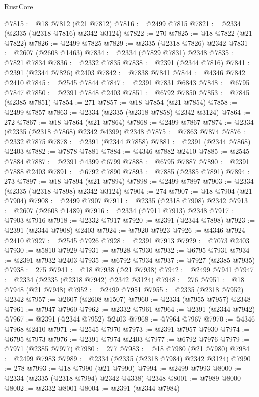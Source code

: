 \begin{lexlean}{RustCore}
\begin{coremodule}
@7815 := @18 @7812 (@21 @7812)
@7816 := @2499 @7815
@7821 := @2334 (@2335 (@2318 @7816) @2342 @3124)
@7822 := 270
@7825 := @18 @7822 (@21 @7822)
@7826 := @2499 @7825
@7829 := @2335 (@2318 @7826) @2342
@7831 := @2607 (@2608 @1463)
@7834 := @2334 (@7829 @7831) @2348
@7835 := @7821 @7834
@7836 := @2332 @7835
@7838 := @2391 (@2344 @7816)
@7841 := @2391 (@2344 @7826) @2403
@7842 := @7838 @7841
@7844 := @4346 @7842 @2410
@7845 := @2545 @7844
@7847 := @2391 @7831 @6843
@7848 := @6795 @7847
@7850 := @2391 @7848 @2403
@7851 := @6792 @7850
@7853 := @7845 (@2385 @7851)
@7854 := 271
@7857 := @18 @7854 (@21 @7854)
@7858 := @2499 @7857
@7863 := @2334 (@2335 (@2318 @7858) @2342 @3124)
@7864 := 272
@7867 := @18 @7864 (@21 @7864)
@7868 := @2499 @7867
@7874 := @2334 (@2335 (@2318 @7868) @2342 @4399) @2348
@7875 := @7863 @7874
@7876 := @2332 @7875
@7878 := @2391 (@2344 @7858)
@7881 := @2391 (@2344 @7868) @2403
@7882 := @7878 @7881
@7884 := @4346 @7882 @2410
@7885 := @2545 @7884
@7887 := @2391 @4399 @6799
@7888 := @6795 @7887
@7890 := @2391 @7888 @2403
@7891 := @6792 @7890
@7893 := @7885 (@2385 @7891)
@7894 := 273
@7897 := @18 @7894 (@21 @7894)
@7898 := @2499 @7897
@7903 := @2334 (@2335 (@2318 @7898) @2342 @3124)
@7904 := 274
@7907 := @18 @7904 (@21 @7904)
@7908 := @2499 @7907
@7911 := @2335 (@2318 @7908) @2342
@7913 := @2607 (@2608 @1489)
@7916 := @2334 (@7911 @7913) @2348
@7917 := @7903 @7916
@7918 := @2332 @7917
@7920 := @2391 (@2344 @7898)
@7923 := @2391 (@2344 @7908) @2403
@7924 := @7920 @7923
@7926 := @4346 @7924 @2410
@7927 := @2545 @7926
@7928 := @2391 @7913
@7929 := @7073 @2403
@7930 := @5810 @7929
@7931 := @7928 @7930
@7932 := @6795 @7931
@7934 := @2391 @7932 @2403
@7935 := @6792 @7934
@7937 := @7927 (@2385 @7935)
@7938 := 275
@7941 := @18 @7938 (@21 @7938)
@7942 := @2499 @7941
@7947 := @2334 (@2335 (@2318 @7942) @2342 @3124)
@7948 := 276
@7951 := @18 @7948 (@21 @7948)
@7952 := @2499 @7951
@7955 := @2335 (@2318 @7952) @2342
@7957 := @2607 (@2608 @1507)
@7960 := @2334 (@7955 @7957) @2348
@7961 := @7947 @7960
@7962 := @2332 @7961
@7964 := @2391 (@2344 @7942)
@7967 := @2391 (@2344 @7952) @2403
@7968 := @7964 @7967
@7970 := @4346 @7968 @2410
@7971 := @2545 @7970
@7973 := @2391 @7957 @7930
@7974 := @6795 @7973
@7976 := @2391 @7974 @2403
@7977 := @6792 @7976
@7979 := @7971 (@2385 @7977)
@7980 := 277
@7983 := @18 @7980 (@21 @7980)
@7984 := @2499 @7983
@7989 := @2334 (@2335 (@2318 @7984) @2342 @3124)
@7990 := 278
@7993 := @18 @7990 (@21 @7990)
@7994 := @2499 @7993
@8000 := @2334 (@2335 (@2318 @7994) @2342 @4338) @2348
@8001 := @7989 @8000
@8002 := @2332 @8001
@8004 := @2391 (@2344 @7984)

\end{coremodule}
\end{lexlean}
